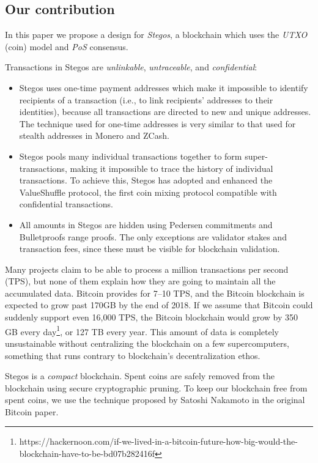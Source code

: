 \documentclass[a4paper, 10pt, conference]{ieeeconf}
\begin{document}
\subsection{Our contribution}
In this paper we propose a design for \textit{Stegos}, a blockchain which uses the \textit{UTXO} (coin) model and \textit{PoS} consensus.

Transactions in Stegos are \textit{unlinkable}, \textit{untraceable}, and \textit{confidential}:

\begin{itemize}
	\item {Stegos uses one-time payment addresses which make it impossible to identify recipients of a transaction (i.e., to link recipients' addresses to their identities), because all transactions are directed to new and unique addresses. The technique used for one-time addresses is very similar to that used for stealth addresses in Monero and ZCash.}
	\item {Stegos pools many individual transactions together to form super-transactions, making it impossible to trace the history of individual transactions. To achieve this, Stegos has adopted and enhanced the ValueShuffle protocol\cite{c7}, the first coin mixing protocol compatible with confidential transactions.}
	\item {All amounts in Stegos are hidden using Pedersen commitments\cite{c8} and Bulletproofs range proofs\cite{c4}. The only exceptions are validator stakes and transaction fees, since these must be visible for blockchain validation.}
\end{itemize}

Many projects claim to be able to process a million transactions per second (TPS), but none of them explain how they are going to maintain all the accumulated data. Bitcoin provides for 7--10 TPS, and the Bitcoin blockchain is expected to grow past 170GB by the end of 2018. If we assume that Bitcoin could suddenly support even 16,000 TPS, the Bitcoin blockchain would grow by 350 GB every day\footnote{https://hackernoon.com/if-we-lived-in-a-bitcoin-future-how-big-would-the-blockchain-have-to-be-bd07b282416f}, or 127 TB every year. This amount of data is completely unsustainable without centralizing the blockchain on a few supercomputers, something that runs contrary to blockchain’s decentralization ethos.

Stegos is a \textit{compact} blockchain. Spent coins are safely removed from the blockchain using secure cryptographic pruning. To keep our blockchain free from spent coins, we use the technique proposed by Satoshi Nakamoto in the original Bitcoin paper\cite{c1}.
\end{document}
